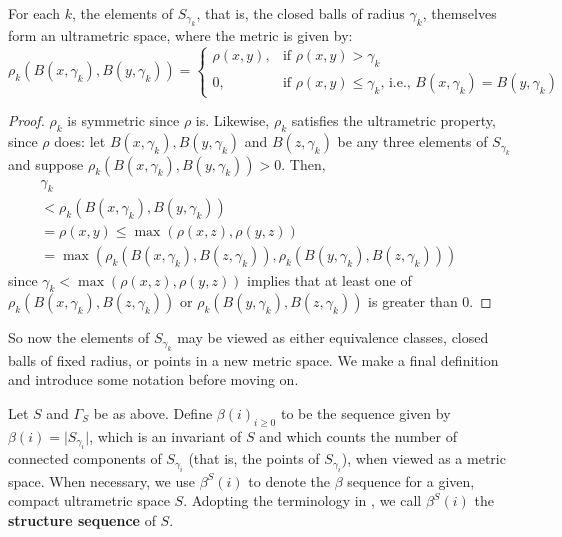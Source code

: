 \begin{lemma}
For each $k$, the elements of $S_{\gamma_k}$, that is, the closed balls of radius $\gamma_k$, themselves form an ultrametric space, where the metric is given by:
\[ \rho_k(B(x, \gamma_k),B(y, \gamma_k)) = 
\begin{cases}
\rho(x,y), & \text{if } \rho(x,y) > \gamma_k \\
0, & \text{if }   \rho(x,y) \leq \gamma_k \text{, i.e., } B(x, \gamma_k)=B(y, \gamma_k)
\end{cases}
\]
\end{lemma}

\begin{proof}
$\rho_k$ is symmetric since $\rho$ is. Likewise, $\rho_k$ satisfies the ultrametric property, since $\rho$ does: let $B(x, \gamma_k),B(y, \gamma_k)$ and $B(z, \gamma_k)$ be any three elements of $S_{\gamma_k}$ and suppose $\rho_k(B(x, \gamma_k),B(y, \gamma_k)) > 0 $. Then,
\begin{align*}
\gamma_k && \\
< \rho_k(B(x, \gamma_k),B(y, \gamma_k)) && \\
= \rho(x,y) \leq \max(\rho(x,z), \rho(y,z)) && \\
= \max(\rho_k(B(x, \gamma_k), B(z, \gamma_k)), \rho_k(B(y, \gamma_k),B(z,\gamma_k)))
\end{align*}
since $ \gamma_k < \max(\rho(x,z), \rho(y,z))$ implies that at least one of $\rho_k(B(x, \gamma_k), B(z, \gamma_k))$ or $\rho_k(B(y, \gamma_k),B(z,\gamma_k))$ is greater than $0$.
\end{proof}

So now the elements of $S_{\gamma_k}$ may be viewed as either equivalence classes, closed balls of fixed radius, or points in a new metric space. We  make a final definition and introduce some notation before moving on.\\

\begin{definition}
Let $S$ and $\Gamma_S$ be as above. Define $\beta(i)_{i \geq 0}$ to be the sequence given by $\beta(i) = \lvert  S_{\gamma_i}\rvert$, which is an invariant of $S$ and which counts the number of connected components of $S_{\gamma_i}$ (that is, the points of $S_{\gamma_i}$), when viewed as a metric space. When necessary, we use $\beta^S(i)$ to denote the $\beta$ sequence for a given, compact  ultrametric space $S$. Adopting the terminology in \cite{fp}, we call $\beta^S(i)$ the \textbf{structure sequence} of $S$.
\end{definition}

